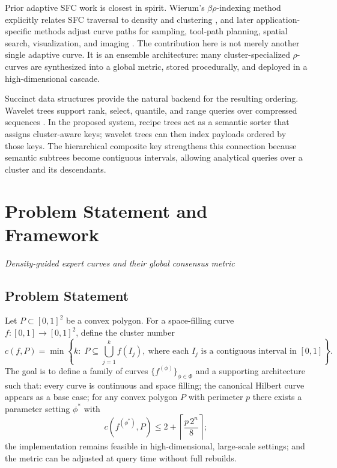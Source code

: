 \documentclass[11pt]{article}
\newcommand{\sectionsubtitle}[1]{\vspace{-0.25em}\noindent\textit{#1}\par\vspace{0.75em}}
\begin{document}
Prior adaptive SFC work is closest in spirit. Wierum's $\beta\rho$-indexing method explicitly relates SFC traversal to density and clustering \cite{wierum2002betarho}, and later application-specific methods adjust curve paths for sampling, tool-path planning, spatial search, visualization, and imaging \cite{quinn2006adaptive,sun2015toolpath,tian2013density,zhou2021data,sakoglu2020space}. The contribution here is not merely another single adaptive curve. It is an ensemble architecture: many cluster-specialized $\rho$-curves are synthesized into a global metric, stored procedurally, and deployed in a high-dimensional cascade.

Succinct data structures provide the natural backend for the resulting ordering. Wavelet trees support rank, select, quantile, and range queries over compressed sequences \cite{grossi2003wavelet,navarro2014wavelet}. In the proposed system, recipe trees act as a semantic sorter that assigns cluster-aware keys; wavelet trees can then index payloads ordered by those keys. The hierarchical composite key strengthens this connection because semantic subtrees become contiguous intervals, allowing analytical queries over a cluster and its descendants.

\section{Problem Statement and Framework}
\label{sec:framework}
\sectionsubtitle{Density-guided expert curves and their global consensus metric}

\subsection{Problem Statement}
Let $P \subset [0,1]^2$ be a convex polygon. For a space-filling curve $f:[0,1]\to[0,1]^2$, define the cluster number
\begin{equation}
c(f,P)=\min\left\{k:\; P\subseteq \bigcup_{j=1}^k f(I_j),\ \text{where each }I_j\text{ is a contiguous interval in }[0,1]\right\}.
\label{eq:cluster-number}
\end{equation}
The goal is to define a family of curves $\{f^{(\phi)}\}_{\phi\in\Phi}$ and a supporting architecture such that: every curve is continuous and space filling; the canonical Hilbert curve appears as a base case; for any convex polygon $P$ with perimeter $p$ there exists a parameter setting $\phi^*$ with
\begin{equation}
c(f^{(\phi^*)},P)\leq 2+\left\lceil \frac{p\,2^n}{8}\right\rceil;
\label{eq:perimeter-bound}
\end{equation}
the implementation remains feasible in high-dimensional, large-scale settings; and the metric can be adjusted at query time without full rebuilds.
\end{document}
